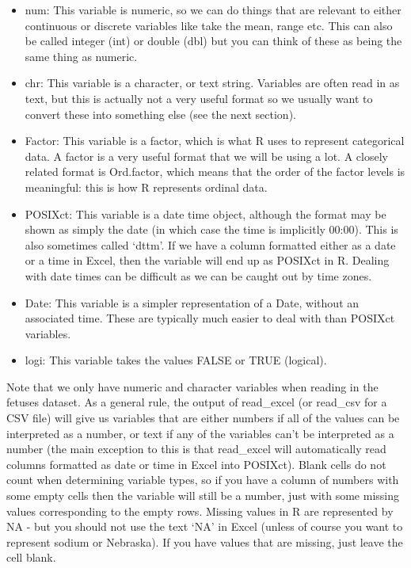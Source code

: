 \documentclass[
]{article}
\begin{document}
\begin{itemize}
\item
  num: This variable is numeric, so we can do things that are relevant
  to either continuous or discrete variables like take the mean, range
  etc. This can also be called integer (int) or double (dbl) but you can
  think of these as being the same thing as numeric.
\item
  chr: This variable is a character, or text string. Variables are often
  read in as text, but this is actually not a very useful format so we
  usually want to convert these into something else (see the next
  section).
\item
  Factor: This variable is a factor, which is what R uses to represent
  categorical data. A factor is a very useful format that we will be
  using a lot. A closely related format is Ord.factor, which means that
  the order of the factor levels is meaningful: this is how R represents
  ordinal data.
\item
  POSIXct: This variable is a date time object, although the format may
  be shown as simply the date (in which case the time is implicitly
  00:00). This is also sometimes called `dttm'. If we have a column
  formatted either as a date or a time in Excel, then the variable will
  end up as POSIXct in R. Dealing with date times can be difficult as we
  can be caught out by time zones.
\item
  Date: This variable is a simpler representation of a Date, without an
  associated time. These are typically much easier to deal with than
  POSIXct variables.
\item
  logi: This variable takes the values FALSE or TRUE (logical).
\end{itemize}

Note that we only have numeric and character variables when reading in
the fetuses dataset. As a general rule, the output of read\_excel (or
read\_csv for a CSV file) will give us variables that are either numbers
if all of the values can be interpreted as a number, or text if any of
the variables can't be interpreted as a number (the main exception to
this is that read\_excel will automatically read columns formatted as
date or time in Excel into POSIXct). Blank cells do not count when
determining variable types, so if you have a column of numbers with some
empty cells then the variable will still be a number, just with some
missing values corresponding to the empty rows. Missing values in R are
represented by NA - but you should not use the text `NA' in Excel
(unless of course you want to represent sodium or Nebraska). If you have
values that are missing, just leave the cell blank.
\end{document}
